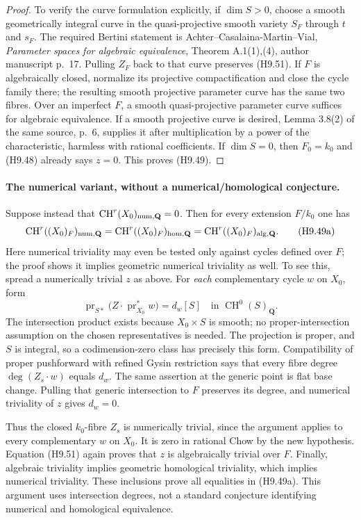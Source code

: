 \begin{proof}
To verify the curve formulation explicitly, if $\dim S>0$, choose
a smooth geometrically integral curve in the quasi-projective smooth
variety $S_F$ through $t$ and $s_F$. The required Bertini statement
is Achter--Casalaina-Martin--Vial, \emph{Parameter spaces for
algebraic equivalence}, Theorem A.1(1),(4), author manuscript p.~17.
Pulling $Z_F$ back to that curve preserves (H9.51). If $F$ is
algebraically closed, normalize its projective compactification and
close the cycle family there; the resulting smooth projective
parameter curve has the same two fibres. Over an imperfect $F$, a
smooth quasi-projective parameter curve suffices for algebraic
equivalence. If a smooth projective curve is desired, Lemma 3.8(2)
of the same source, p.~6, supplies it after multiplication by a power
of the characteristic, harmless with rational coefficients. If
$\dim S=0$, then $F_0=k_0$ and (H9.48) already says $z=0$.
This proves (H9.49).
\end{proof}

\paragraph{The numerical variant, without a numerical/homological conjecture.}
Suppose instead that
$\operatorname{CH}^r(X_0)_{\rm num,\mathbf Q}=0$.
Then for every extension $F/k_0$ one has
\[
 \operatorname{CH}^r((X_0)_F)_{\rm num,\mathbf Q}
   =\operatorname{CH}^r((X_0)_F)_{\rm hom,\mathbf Q}
   =\operatorname{CH}^r((X_0)_F)_{\rm alg,\mathbf Q}.         \tag{H9.49a}
\]
Here numerical triviality may even be tested only against cycles
defined over $F$; the proof shows it implies geometric numerical
triviality as well. To see this, spread a numerically trivial $z$
as above. For \emph{each} complementary cycle $w$ on $X_0$, form
\[
 \operatorname{pr}_{S*}
       \bigl(Z\cdot\operatorname{pr}_{X_0}^*w\bigr)
       =d_w[S]\quad\text{in }\operatorname{CH}^0(S)_{\mathbf Q}.
\]
The intersection product exists because $X_0\times S$ is smooth;
no proper-intersection assumption on the chosen representatives is
needed. The projection is proper, and $S$ is integral, so a
codimension-zero class has precisely this form. Compatibility of
proper pushforward with refined Gysin restriction says that every
fibre degree $\deg(Z_s\cdot w)$ equals $d_w$. The same assertion
at the generic point is flat base change. Pulling that generic
intersection to $F$ preserves its degree, and numerical triviality
of $z$ gives $d_w=0$.

Thus the closed $k_0$-fibre $Z_s$ is numerically trivial, since the
argument applies to every complementary $w$ on $X_0$. It is zero
in rational Chow by the new hypothesis. Equation (H9.51) again
proves that $z$ is algebraically trivial over $F$. Finally,
algebraic triviality implies geometric homological triviality,
which implies numerical triviality. These inclusions prove all
equalities in (H9.49a). This argument uses intersection degrees,
not a standard conjecture identifying numerical and homological
equivalence.

